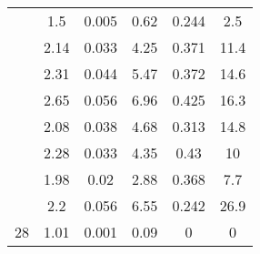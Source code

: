 \begin{longtable}{cccccc}
		& 1.5   & 0.005 & 0.62  & 0.244 & 2.5 \\
		
		& 2.14  & 0.033 & 4.25  & 0.371 & 11.4 \\
		
		& 2.31  & 0.044 & 5.47  & 0.372 & 14.6 \\
		
		& 2.65  & 0.056 & 6.96  & 0.425 & 16.3 \\
		
		& 2.08  & 0.038 & 4.68  & 0.313 & 14.8 \\
		
		& 2.28  & 0.033 & 4.35  & 0.43  & 10 \\
		
		& 1.98  & 0.02  & 2.88  & 0.368 & 7.7 \\
		
		& 2.2   & 0.056 & 6.55  & 0.242 & 26.9 \\
		
		28    & 1.01  & 0.001 & 0.09  & 0     & 0 
		\label{Measurement of  snow density from full polarimetric data}%
	\end{longtable}
%



